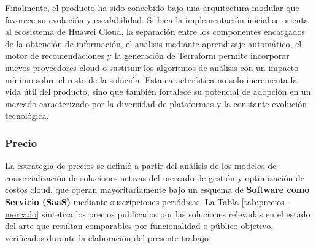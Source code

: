 Finalmente, el producto ha sido concebido bajo una arquitectura modular que favorece su evolución y escalabilidad. Si bien la implementación inicial se orienta al ecosistema de Huawei Cloud, la separación entre los componentes encargados de la obtención de información, el análisis mediante aprendizaje automático, el motor de recomendaciones y la generación de Terraform permite incorporar nuevos proveedores cloud o sustituir los algoritmos de análisis con un impacto mínimo sobre el resto de la solución. Esta característica no solo incrementa la vida útil del producto, sino que también fortalece su potencial de adopción en un mercado caracterizado por la diversidad de plataformas y la constante evolución tecnológica.

\subsubsection{Precio}\label{sec:precio}

La estrategia de precios se definió a partir del análisis de los modelos de comercialización de soluciones activas del mercado de gestión y optimización de costos cloud, que operan mayoritariamente bajo un esquema de \textbf{Software como Servicio (SaaS)} mediante suscripciones periódicas. La Tabla \ref{tab:precios-mercado} sintetiza los precios publicados por las soluciones relevadas en el estado del arte que resultan comparables por funcionalidad o público objetivo, verificados durante la elaboración del presente trabajo.

